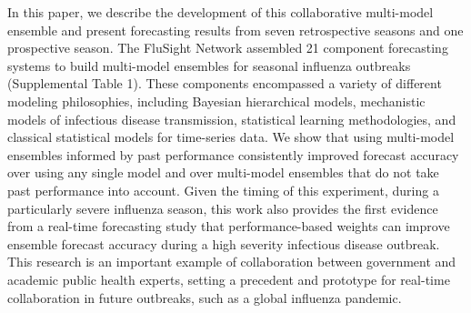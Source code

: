 \documentclass{article}\usepackage[]{graphicx}\usepackage[]{color}
\begin{document}
In this paper, we describe the development of this collaborative multi-model ensemble and present forecasting results from seven retrospective seasons and one prospective season.
The FluSight Network assembled 21 component forecasting systems to build multi-model ensembles for seasonal influenza outbreaks (Supplemental Table 1).
These components encompassed a variety of different modeling philosophies, including Bayesian hierarchical models, mechanistic models of infectious disease transmission, statistical learning methodologies, and classical statistical models for time-series data.
We show that using multi-model ensembles informed by past performance consistently improved forecast accuracy over using any single model and over multi-model ensembles that do not take past performance into account.
Given the timing of this experiment, during a particularly severe influenza season, this work also provides the first evidence from a real-time forecasting study that performance-based weights can improve ensemble forecast accuracy during a high severity infectious disease outbreak. 
This research is an important example of collaboration between government and academic public health experts, setting a precedent and prototype for real-time collaboration in future outbreaks, such as a global influenza pandemic.
\end{document}
